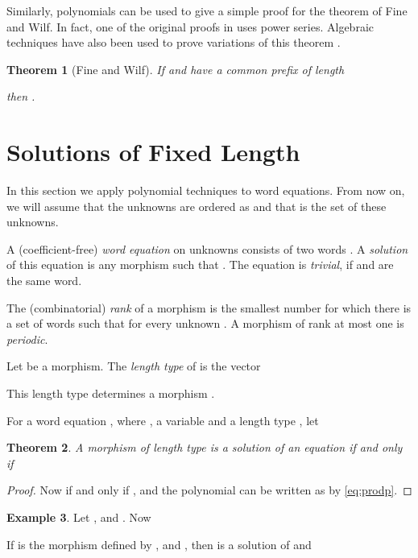 \documentclass[submission]{eptcs}
\newtheorem{theorem}{Theorem}[section]
\theoremstyle{definition}
\newtheorem{example}[theorem]{Example}
\begin{document}
Similarly, polynomials can be used to give a simple proof for the
theorem of Fine and Wilf. In fact, one of the original proofs in
\cite{FiWi65} uses power series. Algebraic techniques have also been
used to prove variations of this theorem \cite{MiShWa01}.

\begin{theorem}[Fine and Wilf] \label{thm:finewilf}
If  and  have a common prefix of length

then .
\end{theorem}

\section{Solutions of Fixed Length} \label{sect:fixedlength}

In this section we apply polynomial techniques to word equations.
From now on, we will assume that the unknowns are ordered as  and that  is the set of these unknowns.

A (coefficient-free) \emph{word equation}  on  unknowns
consists of two words . A \emph{solution} of this
equation is any morphism  such that . The equation is \emph{trivial}, if  and  are the same
word.

The (combinatorial) \emph{rank} of a morphism  is the smallest
number  for which there is a set  of  words such that  for every unknown . A morphism of rank at most one is
\emph{periodic}.

Let  be a morphism. The \emph{length type} of
 is the vector

This length type  determines a morphism .

For a word equation , where , a variable  and a length type , let


\begin{theorem} \label{thm:weqpeq}
A morphism  of length type  is a solution
of an equation  if and only if

\end{theorem}
\begin{proof}
Now  if and only if , and the
polynomial  can be written as  by \eqref{eq:prodp}.
\end{proof}

\begin{example}
Let ,  and . Now

If  is the morphism defined by ,  and , then  is a solution of  and

\end{example}
\end{document}
